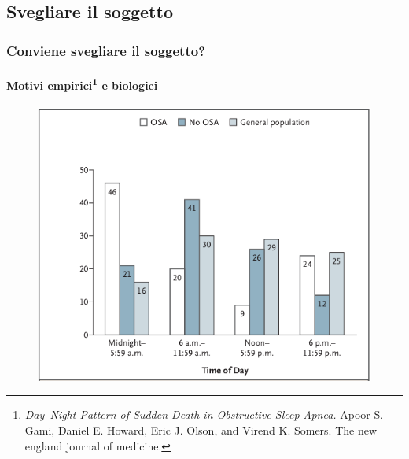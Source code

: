 \subsection{Svegliare il soggetto}
\begin{frame}
    \frametitle{Conviene svegliare il soggetto?}
    \framesubtitle{Motivi empirici\footnote{\emph{Day–Night Pattern of Sudden Death in Obstructive Sleep Apnea.} 
  	Apoor S. Gami, Daniel E. Howard, Eric J. Olson, and Virend K. Somers.
  	The new england journal of medicine.} e biologici}
\begin{center}
\begin{figure}
 \includegraphics[height=0.65\textheight]{./daynight2.png}
\end{figure}
\end{center}

\end{frame}

% 
% 
% 




